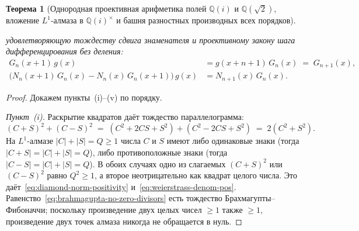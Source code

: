 \documentclass[11pt,a4paper]{article}
\theoremstyle{plain}
\newtheorem{theorem}{Теорема}[section]
\theoremstyle{definition}
\begin{document}
\begin{theorem}[Однородная проективная арифметика полей $\mathbb{Q}(i)$ и $\mathbb{Q}(\sqrt{2})$, вложение $L^1$-алмаза в $\mathbb{Q}(i)^\times$ и башня разностных производных всех порядков]
\begin{enumerate}[label=\textbf{(\roman*)},leftmargin=*]
  удовлетворяющую тождеству сдвига знаменателя и проективному закону шага дифференцирования без деления:
  \begin{align}
    G_n(x+1)\,g(x) &= g(x+n+1)\,G_n(x) \;=\; G_{n+1}(x), \label{eq:quotient-denom-shift} \\
    \bigl(N_n(x+1)\,G_n(x) - N_n(x)\,G_n(x+1)\bigr)\,g(x) &= N_{n+1}(x)\,G_n(x). \label{eq:quotient-deriv-step-cancel}
  \end{align}
\end{enumerate}
\end{theorem}

\begin{proof}
Докажем пункты~(i)--(v) по порядку.

\emph{Пункт~(i).} Раскрытие квадратов даёт тождество параллелограмма:
\begin{equation*}
  (C + S)^2 + (C - S)^2 \;=\; (C^2 + 2CS + S^2) + (C^2 - 2CS + S^2) \;=\; 2(C^2 + S^2).
\end{equation*}
На $L^1$-алмазе $|C| + |S| = Q \ge 1$ числа $C$ и $S$ имеют либо одинаковые знаки (тогда $|C + S| = |C| + |S| = Q$), либо противоположные знаки (тогда $|C - S| = |C| + |S| = Q$). В обоих случаях одно из слагаемых $(C + S)^2$ или $(C - S)^2$ равно $Q^2 \ge 1$, а второе неотрицательно как квадрат целого числа. Это даёт~\eqref{eq:diamond-norm-positivity} и~\eqref{eq:weierstrass-denom-pos}. Равенство~\eqref{eq:brahmagupta-no-zero-divisors} есть тождество Брахмагупты--Фибоначчи; поскольку произведение двух целых чисел $\ge 1$ также $\ge 1$, произведение двух точек алмаза никогда не обращается в нуль.


\end{proof}
\end{document}

